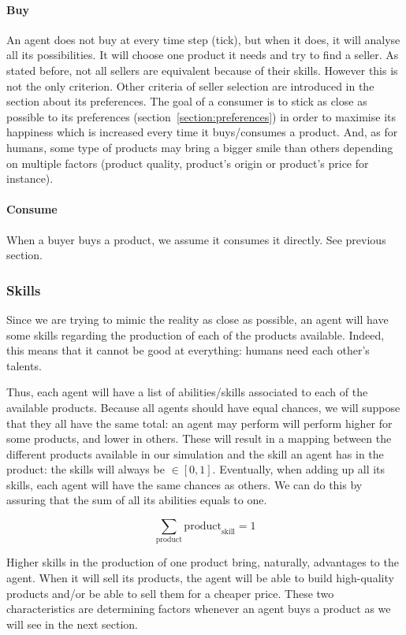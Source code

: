 \documentclass[20pt]{article}
\begin{document}
\paragraph{Buy} 
An agent does not buy at every time step (tick), but when it does, it will analyse all its possibilities. It will choose one product it needs and try to find a seller. As stated before, not all sellers are equivalent because of their skills. However this is not the only criterion. Other criteria of seller selection are introduced in the section about its preferences. The goal of a consumer is to stick as close as possible to its preferences (section~\ref{section:preferences}) in order to maximise its happiness which is increased every time it buys/consumes a product. And, as for humans, some type of products may bring a bigger smile than others depending on multiple factors (product quality, product's origin or product's price for instance).

\paragraph{Consume}
When a buyer buys a product, we assume it consumes it directly. See previous section.

\subsubsection{Skills}\label{section:skills}
Since we are trying to mimic the reality as close as possible, an agent will have some skills regarding the production of each of the products available. Indeed, this means that it cannot be good at everything: humans need each other's talents.

Thus, each agent will have a list of abilities/skills associated to each of the available products. Because all agents should have equal chances, we will suppose that they all have the same total: an agent may perform will perform higher for some products, and lower in others. These will result in a mapping between the different products available in our simulation and the skill an agent has in the product: the skills will always be $\in [0, 1]$. Eventually, when adding up all its skills, each agent will have the same chances as others. We can do this by assuring that the sum of all its abilities equals to one.

$$\sum_{\text{product}} \text{product}_{\text{skill}} = 1$$

Higher skills in the production of one product bring, naturally, advantages to the agent. When it will sell its products, the agent will be able to build high-quality products and/or be able to sell them for a cheaper price. These two characteristics are determining factors whenever an agent buys a product as we will see in the next section.
\end{document}
